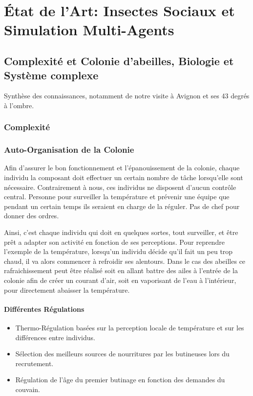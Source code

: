 \documentclass[11pt,a4paper]{report}
\begin{document}
\chapter{État de l'Art: Insectes Sociaux et Simulation Multi-Agents}
	\section{Complexité et Colonie d'abeilles, Biologie et Système complexe}
			Synthèse des connaissances, notamment de notre visite à Avignon et ses 43 degrés à l'ombre.\\
		\subsection{Complexité}
		\subsection{Auto-Organisation de la Colonie}
			Afin d'assurer le bon fonctionnement et l'épanouissement de la colonie, chaque individu la composant doit effectuer un certain nombre de tâche lorsqu'elle sont nécessaire. Contrairement à nous, ces individus ne disposent d'aucun contrôle central. Personne pour surveiller la température et prévenir une équipe que pendant un certain temps ils seraient en charge de la réguler. Pas de chef pour donner des ordres.
			
			Ainsi, c'est chaque individu qui doit en quelques sortes, tout surveiller, et être prêt a adapter son activité en fonction de ses perceptions. Pour reprendre l'exemple de la température, lorsqu'un individu décide qu'il fait un peu trop chaud, il va alors commencer à refroidir ses alentours. Dans le cas des abeilles ce rafraichissement peut être réalisé soit en allant battre des ailes à l'entrée de la colonie afin de créer un courant d'air, soit en vaporisant de l'eau à l'intérieur, pour directement abaisser la température. 		
			
			
			\subsubsection{Différentes Régulations}
			\begin{itemize}
				\item Thermo-Régulation basées sur la perception locale de température et sur les différences entre individus.
				\item Sélection des meilleurs sources de nourritures par les butineuses lors du recrutement.
				\item Régulation de l'âge du premier butinage en fonction des demandes du couvain.
			\end{itemize}
\end{document}

